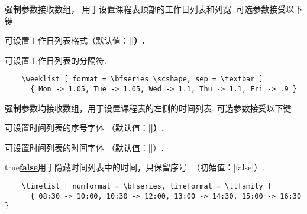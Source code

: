 \documentclass[svgnames]{l3doc}
\def \TFF {true\textup{\textbar\underline{\textbf{false}}}}
\begin{document}
\begin{documentation}
\begin{function}{\weeklist}
  \begin{syntax}
       
  \end{syntax}
  强制参数接收数组，
  用于设置课程表顶部的工作日列表和列宽.
  可选参数接受以下键
  \begin{keyval}
    \item [\key{format}] 
    可设置工作日列表格式（默认值：|\bfseries|）.
    \item [\key{sep}] 
    可设置工作日列表的分隔符.
  \end{keyval}
  \begin{verbatim}
    \weeklist [ format = \bfseries \scshape, sep = \textbar ]
      { Mon -> 1.05, Tue -> 1.05, Wed -> 1.1, Thu -> 1.1, Fri -> .9 }
  \end{verbatim}
\end{function}

\begin{function}{\timelist}
  \begin{syntax}
       
  \end{syntax}
  强制参数均接收数组，用于设置课程表的左侧的时间列表.
  可选参数接受以下键
  \begin{keyval}
    \item [\key{numformat}] 
    可设置时间列表的序号字体
    （默认值：|\ttfamily \bfseries|）.
    \item [\key{timeformat}]  可设置时间列表的时间字体
    （默认值：|\ttfamily|）.
    \item [\key{hidetime}] \val\TFF 用于隐藏时间列表中的时间，只保留序号.
    （初始值：|false|）.
  \end{keyval}
  \begin{verbatim}
    \timelist [ numformat = \bfseries, timeformat = \ttfamily ]
      { 08:30 -> 10:00, 10:30 -> 12:00, 13:00 -> 14:30, 15:00 -> 16:30 }
  \end{verbatim}
\end{function}


\end{documentation}
\end{document}
